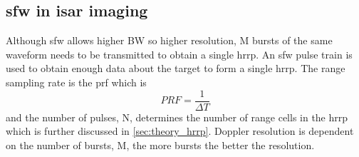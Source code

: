 \documentclass[class=report,11pt,crop=false]{standalone}
\begin{document}
    \subsection{\gls{sfw} in \gls{isar} imaging}
    Although sfw allows higher BW so higher resolution, M bursts of the same waveform needs to be transmitted to obtain a single hrrp. An \gls{sfw} pulse train is used to obtain enough data about the target to form a single \gls{hrrp}. 
    The range sampling rate is the \gls{prf} which is
    \begin{equation}
        PRF = \frac{1}{\Delta T}
    \end{equation}
    and the number of pulses, N, determines the number of range cells in the \gls{hrrp} which is further discussed in \autoref{sec:theory_hrrp}. 
    Doppler resolution is dependent on the number of bursts, M, the more bursts the better the resolution.
\end{document}
